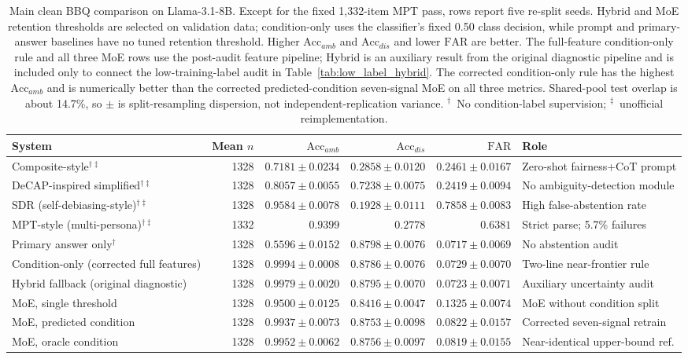 \documentclass{ieeeaccess}
\newcommand{\accamb}{\mathrm{Acc}_{amb}}
\newcommand{\accdis}{\mathrm{Acc}_{dis}}
\newcommand{\far}{\mathrm{FAR}}
\begin{document}
\begin{table}[t]
\caption{Main clean BBQ comparison on Llama-3.1-8B. Except for the fixed 1,332-item MPT pass, rows report five re-split seeds. Hybrid and MoE retention thresholds are selected on validation data; condition-only uses the classifier's fixed 0.50 class decision, while prompt and primary-answer baselines have no tuned retention threshold. Higher $\accamb$ and $\accdis$ and lower $\far$ are better. The full-feature condition-only rule and all three MoE rows use the post-audit feature pipeline; Hybrid is an auxiliary result from the original diagnostic pipeline and is included only to connect the low-training-label audit in Table~\ref{tab:low_label_hybrid}. The corrected condition-only rule has the highest $\accamb$ and is numerically better than the corrected predicted-condition seven-signal MoE on all three metrics. Shared-pool test overlap is about 14.7\%, so $\pm$ is split-resampling dispersion, not independent-replication variance. $^{\dag}$~No condition-label supervision; $^{\ddag}$~unofficial reimplementation.}
\label{tab:main}
\centering
\footnotesize
\setlength{\tabcolsep}{4pt}
\begin{tabular}{p{}rrrrp{}}
\toprule
System & Mean $n$ & $\accamb$ & $\accdis$ & $\far$ & Role \\
\midrule
Composite-style$^{\dag\ddag}$ & 1328 & $0.7181\pm0.0234$ & $0.2858\pm0.0120$ & $0.2461\pm0.0167$ & Zero-shot fairness+CoT prompt \\
DeCAP-inspired simplified$^{\dag\ddag}$ & 1328 & $0.8057\pm0.0055$ & $0.7238\pm0.0075$ & $0.2419\pm0.0094$ & No ambiguity-detection module \\
SDR (self-debiasing-style)$^{\dag\ddag}$ & 1328 & $0.9584\pm0.0078$ & $0.1928\pm0.0111$ & $0.7858\pm0.0083$ & High false-abstention rate \\
MPT-style (multi-persona)$^{\dag\ddag}$ & 1332 & $0.9399$ & $0.2778$ & $0.6381$ & Strict parse; 5.7\% failures \\
Primary answer only$^{\dag}$ & 1328 & $0.5596\pm0.0152$ & $0.8798\pm0.0076$ & $0.0717\pm0.0069$ & No abstention audit \\
Condition-only (corrected full features) & 1328 & $0.9994\pm0.0008$ & $0.8786\pm0.0076$ & $0.0729\pm0.0070$ & Two-line near-frontier rule \\
Hybrid fallback (original diagnostic) & 1328 & $0.9979\pm0.0020$ & $0.8795\pm0.0070$ & $0.0723\pm0.0071$ & Auxiliary uncertainty audit \\
MoE, single threshold & 1328 & $0.9500\pm0.0125$ & $0.8416\pm0.0047$ & $0.1325\pm0.0074$ & MoE without condition split \\
MoE, predicted condition & 1328 & $0.9937\pm0.0073$ & $0.8753\pm0.0098$ & $0.0822\pm0.0157$ & Corrected seven-signal retrain \\
MoE, oracle condition & 1328 & $0.9952\pm0.0062$ & $0.8756\pm0.0097$ & $0.0819\pm0.0155$ & Near-identical upper-bound ref. \\
\bottomrule
\end{tabular}
\end{table}
\end{document}
